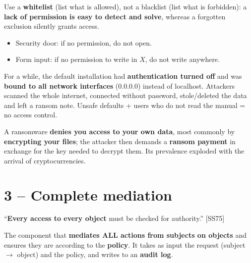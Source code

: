\begin{propbox}[title={Whitelist, not blacklist}]
Use a \textbf{whitelist} (list what is allowed), not a blacklist (list what is
forbidden): a \textbf{lack of permission is easy to detect and solve}, whereas a
forgotten exclusion silently grants access.
\end{propbox}

\begin{exbox}[title=Fail-safe defaults]
\begin{itemize}
  \item Security door: if no permission, do not open.
  \item Form input: if no permission to write in $X$, do not write anywhere.
\end{itemize}
\end{exbox}

\begin{exbox}[title=MongoDB ransomware (2017) --- ease of use vs.\ security]
For a while, the default installation had \textbf{authentication turned off} and was
\textbf{bound to all network interfaces} (0.0.0.0) instead of localhost. Attackers
scanned the whole internet, connected without password, stole/deleted the data and left
a ransom note. Unsafe defaults + users who do not read the manual = no access control.
\end{exbox}

\begin{rembox}[title=Ransomware]
A ransomware \textbf{denies you access to your own data}, most commonly by
\textbf{encrypting your files}; the attacker then demands a \textbf{ransom payment} in
exchange for the key needed to decrypt them. Its prevalence exploded with the arrival of
cryptocurrencies.
\end{rembox}

\section{3 -- Complete mediation}

\begin{defnbox}[title=Complete mediation]
``\textbf{Every access to every object} must be checked for authority.'' [SS75]
\end{defnbox}

\begin{defnbox}[title=Reference monitor]
The component that \textbf{mediates ALL actions from subjects on objects} and ensures
they are according to the \textbf{policy}. It takes as input the request
(subject $\to$ object) and the policy, and writes to an \textbf{audit log}.
\end{defnbox}

